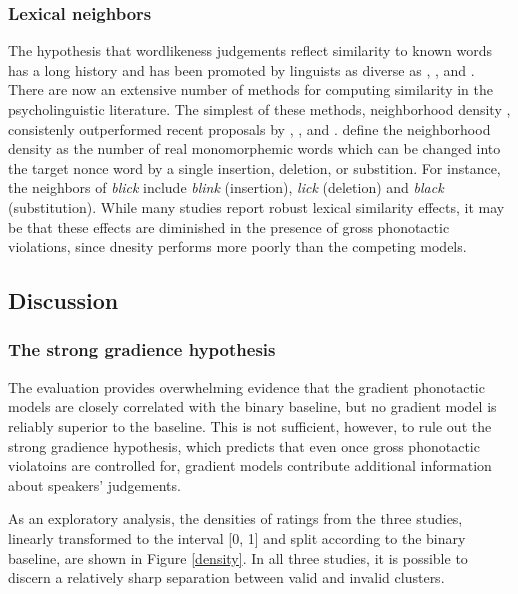 \subsubsection{Lexical neighbors}

The hypothesis that wordlikeness judgements reflect similarity to known words has a long history and has been promoted by linguists as diverse as \citet{Greenberg1964}, \citet{Ohala1986b}, and \citet{Schutze2005}. There are now an extensive number of methods for computing similarity in the psycholinguistic literature. The simplest of these methods, neighborhood density \citep{Coltheart1977}, consistenly outperformed recent proposals by \citet{Bailey2001}, \citet{Vaden2009}, and \citet{Suarez2011}. \citeauthor{Coltheart1977} define the neighborhood density as the number of real monomorphemic words which can be changed into the target nonce word by a single insertion, deletion, or substition. For instance, the neighbors of \emph{blick} include \emph{blink} (insertion), \emph{lick} (deletion) and \emph{black} (substitution). While many studies \citep[e.g.,][]{Bailey2001} report robust lexical similarity effects, it may be that these effects are diminished in the presence of gross phonotactic violations, since dnesity performs more poorly than the competing models.

\subsection{Discussion}
\label{2dis}

\subsubsection{The strong gradience hypothesis}

The evaluation provides overwhelming evidence that the gradient phonotactic models are closely correlated with the binary baseline, but no gradient model is reliably superior to the baseline. This is not sufficient, however, to rule out the strong gradience hypothesis, which predicts that even once gross phonotactic violatoins are controlled for, gradient models contribute additional information about speakers' judgements.

As an exploratory analysis, the densities of ratings from the three studies, linearly transformed to the interval [0, 1] and split according to the binary baseline, are shown in Figure \ref{density}. In all three studies, it is possible to discern a relatively sharp separation between valid and invalid clusters.

